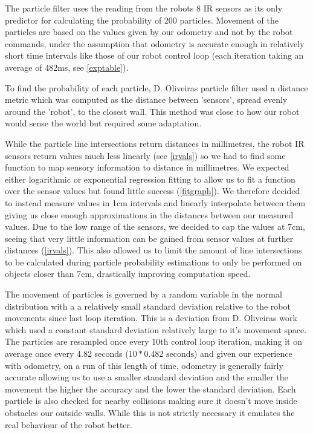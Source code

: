 \documentclass[paper=a4, fontsize=12pt]{scrartcl}	%
\numberwithin{equation}{section}		%
\numberwithin{figure}{section}			%
\numberwithin{table}{section}				%
\begin{document}
The particle filter uses the reading from the robots 8 IR sensors as its only predictor for calculating the probability of 200 particles. Movement of the particles are based on the values given by our odometry and not by the robot commands, under the assumption that odometry is accurate enough in relatively short time intervals like those of our robot control loop (each iteration taking an average of 482ms, see \ref{exptable}).

To find the probability of each particle, D. Oliveiras particle filter used a distance metric which was computed as the distance between 'sensors', spread evenly around the 'robot', to the closest wall. This method was close to how our robot would sense the world but required some adaptation. 

While the particle line intersections return distances in millimetres, the robot IR sensors return values much less linearly (see \ref{irvals}) so we had to find some function to map sensory information to distance in millimetres. We expected either logarithmic or exponential regression fitting to allow us to fit a function over the sensor values but found little success (\ref{fitgraph})\cite{wolfram}. We therefore decided to instead measure values in 1cm intervals and linearly interpolate between them giving us close enough approximations in the distances between our measured values. Due to the low range of the sensors, we decided to cap the values at 7cm, seeing that very little information can be gained from sensor values at further distances (\ref{irvals}). This also allowed us to limit the amount of line intersections to be calculated during particle probability estimations to only be performed on objects closer than 7cm, drastically improving computation speed. 

The movement of particles is governed by a random variable in the normal distribution with a a relatively small standard deviation relative to the robot movements since last loop iteration. This is a deviation from D. Oliveiras work which used a constant standard deviation relatively large to it's movement space. The particles are resampled once every 10th control loop iteration, making it on average once every 4.82 seconds (\(10* 0.482\text{ seconds}\)) and given our experience with odometry, on a run of this length of time, odometry is generally fairly accurate allowing us to use a smaller standard deviation and the smaller the movement the higher the accuracy and the lower the standard deviation. Each particle is also checked for nearby collisions making sure it doesn't move inside obstacles our outside walls. While this is not strictly necessary it emulates the real behaviour of the robot better.
\end{document}
